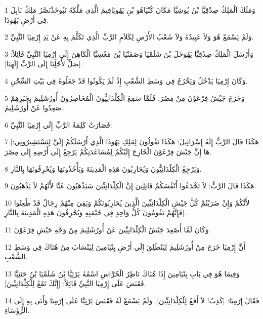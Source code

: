 \par 1 وَمَلَكَ الْمَلِكُ صِدْقِيَّا بْنُ يُوشِيَّا مَكَانَ كُنْيَاهُو بْنِ يَهُويَاقِيمَ الَّذِي مَلَّكَهُ نَبُوخَذْنَصَّرُ مَلِكُ بَابِلَ فِي أَرْضِ يَهُوذَا.
\par 2 وَلَمْ يَسْمَعْ هُوَ وَلاَ عَبِيدُهُ وَلاَ شَعْبُ الأَرْضِ لِكَلاَمِ الرَّبِّ الَّذِي تَكَلَّمَ بِهِ عَنْ يَدِ إِرْمِيَا النَّبِيِّ.
\par 3 وَأَرْسَلَ الْمَلِكُ صِدْقِيَّا يَهُوخَلَ بْنَ شَلَمْيَا وَصَفَنْيَا بْنَ مَعْسِيَّا الْكَاهِنَ إِلَى إِرْمِيَا النَّبِيِّ قَائِلاً: [صَلِّ لأَجْلِنَا إِلَى الرَّبِّ إِلَهِنَا].
\par 4 وَكَانَ إِرْمِيَا يَدْخُلُ وَيَخْرُجُ فِي وَسَطِ الشَّعْبِ إِذْ لَمْ يَكُونُوا قَدْ جَعَلُوهُ فِي بَيْتِ السِّجْنِ.
\par 5 وَخَرَجَ جَيْشُ فِرْعَوْنَ مِنْ مِصْرَ. فَلَمَّا سَمِعَ الْكِلْدَانِيُّونَ الْمُحَاصِرُونَ أُورُشَلِيمَ بِخَبَرِهِمْ صَعِدُوا عَنْ أُورُشَلِيمَ.
\par 6 فَصَارَتْ كَلِمَةُ الرَّبِّ إِلَى إِرْمِيَا النَّبِيِّ:
\par 7 [هَكَذَا قَالَ الرَّبُّ إِلَهُ إِسْرَائِيلَ: هَكَذَا تَقُولُونَ لِمَلِكِ يَهُوذَا الَّذِي أَرْسَلَكُمْ إِلَيَّ لِتَسْتَشِيرُونِي: هَا إِنَّ جَيْشَ فِرْعَوْنَ الْخَارِجَ إِلَيْكُمْ لِمُسَاعَدَتِكُمْ يَرْجِعُ إِلَى أَرْضِهِ إِلَى مِصْرَ.
\par 8 وَيَرْجِعُ الْكِلْدَانِيُّونَ وَيُحَارِبُونَ هَذِهِ الْمَدِينَةَ وَيَأْخُذُونَهَا وَيُحْرِقُونَهَا بِالنَّارِ.
\par 9 هَكَذَا قَالَ الرَّبُّ: لاَ تَخْدَعُوا أَنْفُسَكُمْ قَائِلِينَ إِنَّ الْكِلْدَانِيِّينَ سَيَذْهَبُونَ عَنَّا لأَنَّهُمْ لاَ يَذْهَبُونَ.
\par 10 لأَنَّكُمْ وَإِنْ ضَرَبْتُمْ كُلَّ جَيْشِ الْكِلْدَانِيِّينَ الَّذِينَ يُحَارِبُونَكُمْ وَبَقِيَ مِنْهُمْ رِجَالٌ قَدْ طُعِنُوا فَإِنَّهُمْ يَقُومُونَ كُلُّ وَاحِدٍ فِي خَيْمَتِهِ وَيُحْرِقُونَ هَذِهِ الْمَدِينَةَ بِالنَّارِ].
\par 11 وَكَانَ لَمَّا أُصْعِدَ جَيْشُ الْكِلْدَانِيِّينَ عَنْ أُورُشَلِيمَ مِنْ وَجْهِ جَيْشِ فِرْعَوْنَ
\par 12 أَنَّ إِرْمِيَا خَرَجَ مِنْ أُورُشَلِيمَ لِيَنْطَلِقَ إِلَى أَرْضِ بِنْيَامِينَ لِيَنْسَابَ مِنْ هُنَاكَ فِي وَسَطِ الشَّعْبِ.
\par 13 وَفِيمَا هُوَ فِي بَابِ بِنْيَامِينَ إِذَا هُنَاكَ نَاظِرُ الْحُرَّاسِ اسْمُهُ يَرْئِيَّا بْنُ شَلَمْيَا بْنُ حَنَنِيَّا فَقَبَضَ عَلَى إِرْمِيَا النَّبِيِّ قَائِلاً: [إِنَّكَ تَقَعُ لِلْكِلْدَانِيِّينَ].
\par 14 فَقَالَ إِرْمِيَا: [كَذِبٌ! لاَ أَقَعُ لِلْكِلْدَانِيِّينَ]. وَلَمْ يَسْمَعْ لَهُ فَقَبَضَ يَرْئِيَّا عَلَى إِرْمِيَا وَأَتَى بِهِ إِلَى الرُّؤَسَاءِ.

